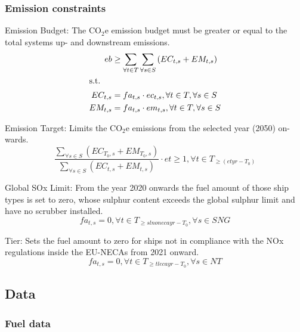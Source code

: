 \documentclass[article]{elsarticle}
\begin{document}
\subsubsection{Emission constraints}
\noindent Emission Budget: The CO$_2$e emission budget must be greater or equal to the total systems up- and downstream emissions.
\begin{subequations}
    \begin{align}
    eb &\geq \sum_{\forall t \in T}\sum_{\forall s \in S}\left(EC_{t,s} + EM_{t,s} \right) \label{eq:co2ebudget}\\
    \intertext{s.t.}
    EC_{t,s} &= fa_{t,s} \cdot ec_{t,s}, \forall t \in T, \forall s \in S\\
    EM_{t,s} &= fa_{t,s} \cdot em_{t,s}, \forall t \in T, \forall s \in S
    \end{align}
\end{subequations}
\par\noindent
Emission Target: Limits the CO$_2$e emissions from the selected year (2050) on-wards.
\begin{equation}
    \frac{\sum_{\forall s \in S} \left(EC_{T_0,s}+EM_{T_0,s}\right)}{\sum_{\forall s \in S} \left(EC_{t,s}+EM_{t,s}\right)} \cdot et \geq 1, \forall t \in T_{\geq \left(etyr-T_0\right)}
\end{equation}
\par\noindent
Global SOx Limit: From the year 2020 onwards the fuel amount of those ship types is set to zero, whose sulphur content exceeds the global sulphur limit and have no scrubber installed.
\begin{equation}
    fa_{t,s} = 0, \forall t \in T_{\geq slnonecayr-T_0}, \forall s \in SNG \label{eq:sox_global}
\end{equation}
\par\noindent
Tier: Sets the fuel amount to zero for ships not in compliance with the NOx regulations inside the EU-NECAs from 2021 onward.
\begin{equation}
   fa_{t,s} = 0, \forall t \in T_{\geq tlecayr-T_0},\forall s \in NT \label{eq:tier}
\end{equation}

\subsection{Data}
\label{subsec:Dat}
\subsubsection{Fuel data}
\end{document}

